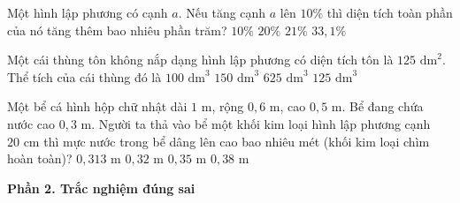 \begin{ex} %
Một hình lập phương có cạnh $a$. Nếu tăng cạnh $a$ lên $10\%$ thì diện tích toàn phần của nó tăng thêm bao nhiêu phần trăm?
\choice
{$10\%$}
{$20\%$}
{\True $21\%$}
{$33{,}1\%$}
\end{ex}

\begin{ex} %
Một cái thùng tôn không nắp dạng hình lập phương có diện tích tôn là $125\text{ dm}^2$. Thể tích của cái thùng đó là
\choice
{$100\text{ dm}^3$}
{$150\text{ dm}^3$}
{$625\text{ dm}^3$}
{\True $125\text{ dm}^3$}
\end{ex}

\begin{ex} %
Một bể cá hình hộp chữ nhật dài $1\text{ m}$, rộng $0{,}6\text{ m}$, cao $0{,}5\text{ m}$. Bể đang chứa nước cao $0{,}3\text{ m}$. Người ta thả vào bể một khối kim loại hình lập phương cạnh $20\text{ cm}$ thì mực nước trong bể dâng lên cao bao nhiêu mét (khối kim loại chìm hoàn toàn)?
\choice
{\True $0{,}313\text{ m}$}
{$0{,}32\text{ m}$}
{$0{,}35\text{ m}$}
{$0{,}38\text{ m}$}
\end{ex}

\textbf{Phần 2. Trắc nghiệm đúng sai}

